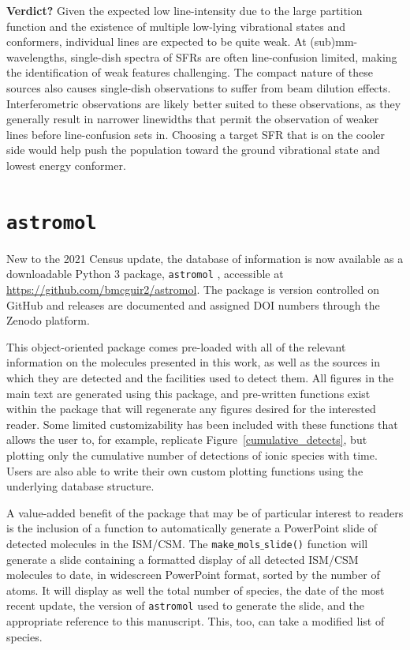 \documentclass[twocolumn]{aastex631}
\newcommand{\update}[1]{{#1}}
\begin{document}
\textbf{Verdict?}  Given the expected low line-intensity due to the large partition function and the existence of multiple low-lying vibrational states and conformers, individual lines are expected to be quite weak.  At (sub)mm-wavelengths, single-dish spectra of SFRs are often line-confusion limited, making the identification of weak features challenging.  The compact nature of these sources also causes single-dish observations to suffer from beam dilution effects.  Interferometric observations are likely better suited to these observations, as they generally result in narrower linewidths that permit the observation of weaker lines before line-confusion sets in.  Choosing a target SFR that is on the cooler side would help push the population toward the ground vibrational state and lowest energy conformer.

\section{\update{\texttt{astromol}}}
\label{app:script}

\setcounter{figure}{0}    
\setcounter{table}{0} 

\update{New to the 2021 Census update, the database of information is now available as a downloadable Python 3 package, \texttt{astromol} \citep{brett_a_mcguire_2021_5046939}, accessible at \href{https://github.com/bmcguir2/astromol}{\url{https://github.com/bmcguir2/astromol}}.  The package is version controlled on GitHub and releases are documented and assigned DOI numbers through the Zenodo platform.}

\update{This object-oriented package comes pre-loaded with all of the relevant information on the molecules presented in this work, as well as the sources in which they are detected and the facilities used to detect them.  All figures in the main text are generated using this package, and pre-written functions exist within the package that will regenerate any figures desired for the interested reader.  Some limited customizability has been included with these functions that allows the user to, for example, replicate Figure~\ref{cumulative_detects}, but plotting only the cumulative number of detections of ionic species with time.  Users are also able to write their own custom plotting functions using the underlying database structure.}

\update{A value-added benefit of the package that may be of particular interest to readers is the inclusion of a function to automatically generate a PowerPoint slide of detected molecules in the ISM/CSM.  The \texttt{make$\_$mols$\_$slide()} function will generate a slide containing a formatted display of all detected ISM/CSM molecules to date, in widescreen PowerPoint format, sorted by the number of atoms. It will display as well the total number of species, the date of the most recent update, the version of \texttt{astromol} used to generate the slide, and the appropriate reference to this manuscript. This, too, can take a modified list of species.}
\end{document}

